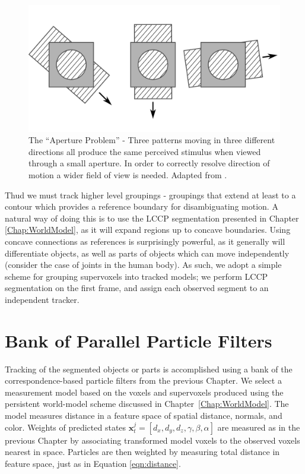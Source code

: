 \begin{figure}[!t]
  \includegraphics[width=\linewidth]{figures/Tracking/Aperture.png}
  \caption[The Aperture Problem]{The ``Aperture Problem'' - Three patterns moving in three different directions all produce the same perceived stimulus when viewed through a small aperture. In order to correctly resolve direction of motion a wider field of view is needed. Adapted from \cite{kandel2000principles}.}
  \label{fig:Aperture}
\end{figure}

Thud we must track higher level groupings - groupings that extend at least to a contour which provides a reference boundary for disambiguating motion. A natural way of doing this is to use the LCCP segmentation presented in Chapter \ref{Chap:WorldModel}, as it will expand regions up to concave boundaries. Using concave connections as references is surprisingly powerful, as it generally will differentiate objects, as well as parts of objects which can move independently (consider the case of joints in the human body). As such, we adopt a simple scheme for grouping supervoxels into tracked models; we perform LCCP segmentation on the first frame, and assign each observed segment to an independent tracker.

\section{Bank of Parallel Particle Filters}
Tracking of the segmented objects or parts is accomplished using a bank of the correspondence-based particle filters from the previous Chapter. We select a measurement model based on the voxels and supervoxels produced using the persistent world-model scheme discussed in Chapter~\ref{Chap:WorldModel}. The model measures distance in a feature space of spatial distance, normals, and color. Weights of predicted states $\mathbf{x}^j_t = [d_x, d_y, d_z, \gamma, \beta, \alpha]$ are measured as in the previous Chapter by associating transformed model voxels to the observed voxels nearest in space. Particles are then weighted by measuring total distance in feature space, just as in Equation \ref{eqn:distance}.

